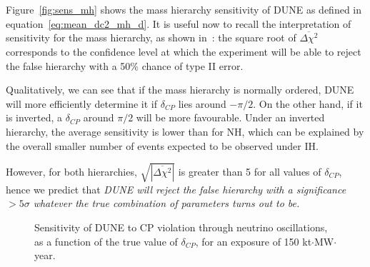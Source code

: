Figure~\ref{fig:sens_mh} shows the mass hierarchy sensitivity of DUNE as
defined in equation~\ref{eq:mean_dc2_mh_d}. It is useful now to recall the
interpretation of sensitivity for the mass hierarchy, as shown
in~\cite{blennow}: the square root of $\overline{\Delta\chi^2}$ corresponds to
the confidence level at which the experiment will be able to reject the false
hierarchy with a 50\% chance of type II error.

Qualitatively, we can see that if
the mass hierarchy is normally ordered, DUNE will more efficiently determine it
if $\delta_{CP}$ lies around $-\pi/2$. On the other hand, if it is inverted, a $\delta_{CP}$
around $\pi/2$ will be more favourable. Under an inverted hierarchy, the
average sensitivity is lower than for NH, which can be explained by the overall smaller
number of events expected to be observed under IH. 

However, for both
hierarchies, $\sqrt{|\overline{\Delta\chi^2}|}$ is greater than 5 for all
values of $\delta_{CP}$, hence we predict that \emph{DUNE will reject the false
hierarchy with a significance $>5\sigma$ whatever the true combination of parameters
turns out to be.}

\begin{figure}
	\centering
\caption{Sensitivity of DUNE to CP violation through neutrino oscillations, as
	a function of the true value of $\delta_{CP}$, for an exposure of 150
	kt$\cdot$MW$\cdot$year.}
\label{fig:sens_cp}
\end{figure}

